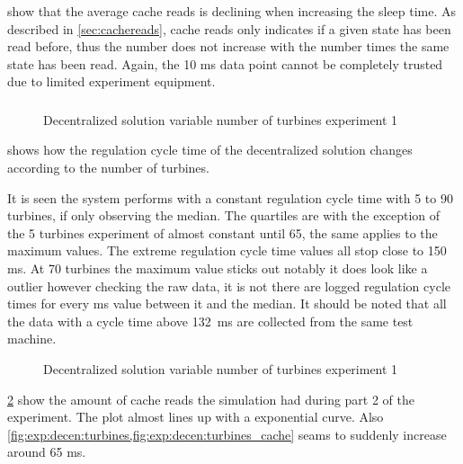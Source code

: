 \FloatBarrier

 show that the average cache reads is declining when increasing the sleep time. As described in \cref{sec:cachereads}, cache reads only indicates if a given state has been read before, thus the number does not increase with the number times the same state has been read. Again, the 10 ms data point cannot be completely trusted due to limited experiment equipment.

\clearpage
\subsubsection{}

\begin{figure}[h!]
	\centering
%	
	
	
	\caption{Decentralized solution variable number of turbines experiment 1}
	\label{fig:exp:decen:turbines}
\end{figure}

 shows how the regulation cycle time of the decentralized solution changes according to the number of turbines.

It is seen the system performs with a constant regulation cycle time with 5 to 90 turbines, if only observing the median.
The quartiles are with the exception of the 5 turbines experiment of almost constant until 65, the same applies to the maximum values.
The extreme regulation cycle time values all  stop close to 150 ms.
At 70 turbines the maximum value sticks out notably it does look like a outlier however checking the raw data, it is not there are logged regulation cycle times for every ms value between it and the median.
It should be noted that all the data with a cycle time above 132~ms are collected from the same test machine.

\begin{figure}[h!]
	\centering
	
	\caption{Decentralized solution variable number of turbines experiment 1}
	\label{fig:exp:decen:turbines_cache}
\end{figure}


\cref{fig:exp:decen:turbines_cache} show the amount of cache reads the simulation had during part 2 of the experiment.
The plot almost lines up with a exponential curve. Also \cref{fig:exp:decen:turbines,fig:exp:decen:turbines_cache} seams to suddenly increase around 65 ms.

